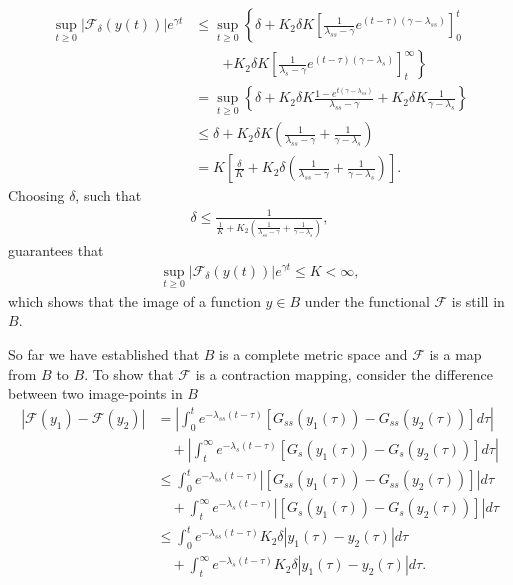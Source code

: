 \begin{solution}[9.8]
\begin{align}
\sup_{t\geq 0}|\mathcal{F}_\delta(y(t))|e^{\gamma t} &\leq 
\sup_{t\geq 0} \left \{ \delta +  K_2 \delta K \left [ \frac{1}{\lambda_{ss} - \gamma}e^{(t-\tau)(\gamma - \lambda_{ss})}\right]_0^t\right.\\
						     &\qquad \left.+ K_2 \delta K \left [ \frac{1}{\lambda_{s} - \gamma}e^{(t-\tau)(\gamma - \lambda_{s})}\right]_t^\infty \right \}   \\
&=  \sup_{t\geq 0} \left \{ \delta +  K_2 \delta K  \frac{1 - e^{t(\gamma - \lambda_{ss})}}{\lambda_{ss} - \gamma} + K_2 \delta K \frac{1}{\gamma - \lambda_{s} }\right \}  \\
& \leq \delta +  K_2 \delta K \left( \frac{1}{\lambda_{ss} - \gamma} + \frac{1}{\gamma - \lambda_{s} }\right)\\ 
&= K \left[\frac{\delta}{K}+K_2 \delta \left( \frac{1}{\lambda_{ss} - \gamma} + \frac{1}{\gamma - \lambda_{s} }\right) \right ].
\end{align}
Choosing $\delta$, such that
\begin{align}
\delta \leq \frac{1}{\frac{1}{K}+K_2 \left( \frac{1}{\lambda_{ss} - \gamma} + \frac{1}{\gamma - \lambda_{s} }\right) },
\end{align}
guarantees that 
\begin{align}
\sup_{t\geq 0}|\mathcal{F}_\delta(y(t))|e^{\gamma t} \leq K < \infty,
\end{align}
which shows that the image of a function $y\in B$ under the functional $\mathcal{F}$ is still in $B$. 

So far we have established that $B$ is a complete metric space and $\mathcal{F}$ is a map from $B$ to $B$. To show that $\mathcal{F}$ is a contraction mapping, consider the difference between two image-points in $B$
\begin{align}
    |\mathcal{F}(y_1) - \mathcal{F}(y_2)| &= \left \vert\int_{0}^t e^{-\lambda_{ss}(t-\tau)}[G_{ss}(y_1(\tau)) - G_{ss}(y_2(\tau))]d\tau \right \vert \\
					  &\quad+  \left \vert \int_{t}^\infty e^{-\lambda_s(t-\tau)}[G_{s}(y_1(\tau)) - G_{s}(y_2(\tau))]d\tau \right \vert \\
    & \leq \int_{0}^t e^{-\lambda_{ss}(t-\tau)}|[G_{ss}(y_1(\tau)) - G_{ss}(y_2(\tau))]|d\tau  \\
    &\quad +  \int_{t}^\infty e^{-\lambda_s(t-\tau)}|[G_{s}(y_1(\tau)) - G_{s}(y_2(\tau))] | d\tau  \\
    & \leq \int_{0}^t e^{-\lambda_{ss}(t-\tau)}K_2 \delta |y_1(\tau) - y_2(\tau)|d\tau \\ 
    &\quad +  \int_{t}^\infty e^{-\lambda_s(t-\tau)}K_2\delta |y_1(\tau) - y_2(\tau) | d\tau.
\end{align}


\end{solution}
